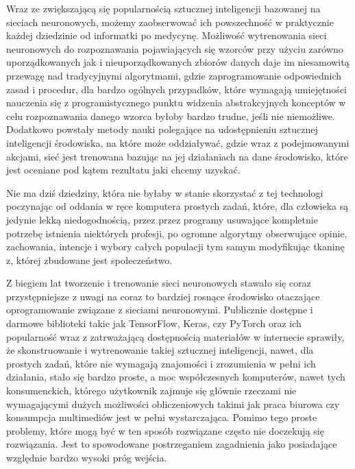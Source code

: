 Wraz ze zwiększającą się popularnością sztucznej inteligencji bazowanej na sieciach neuronowych, możemy zaobserwować ich powszechność w praktycznie każdej dziedzinie od informatki po medycynę. Możliwość wytrenowania sieci neuronowych do rozpoznawania pojawiających się wzorców przy użyciu zarówno uporządkowanych jak i nieuporządkowanych zbiorów danych daje im niesamowitą przewagę nad tradycyjnymi algorytmami, gdzie zaprogramowanie odpowiednich zasad i procedur, dla bardzo ogólnych przypadków, które wymagają umiejętności nauczenia się z programistycznego punktu widzenia abstrakcyjnych konceptów w celu rozpoznawania danego wzorca byłoby bardzo trudne, jeśli nie niemożliwe. Dodatkowo powstały metody nauki polegające na udostępnieniu  sztucznej inteligencji środowiska, na które może oddziaływać, gdzie wraz z podejmowanymi akcjami, sieć jest trenowana bazując na jej działaniach na dane środowisko, które jest oceniane pod kątem rezultatu jaki chcemy uzyskać.

Nie ma dziś dziedziny, która nie byłaby w stanie skorzystać z tej technologi poczynając od oddania w ręce komputera prostych zadań, które, dla człowieka są jedynie lekką niedogodnością, przez przez programy usuwające kompletnie potrzebę istnienia niektórych profesji, po ogromne algorytmy obserwujące opinie, zachowania, intencje i wybory całych populacji tym samym modyfikując tkaninę z, której zbudowane jest społeczeństwo.


Z biegiem lat tworzenie i trenowanie sieci neuronowych stawało się coraz przystępniejsze z uwagi na coraz to bardziej rosnące środowisko otaczające oprogramowanie związane z sieciami neuronowymi. Publicznie dostępne i darmowe biblioteki takie jak TensorFlow, Keras, czy PyTorch oraz ich popularność wraz z zatrważającą dostępnością materiałów w internecie sprawiły, że skonstruowanie i wytrenowanie takiej sztucznej inteligencji, nawet, dla prostych zadań, które nie wymagają znajomości i zrozumienia w pełni ich działania, stało się bardzo proste, a moc współczesnych komputerów, nawet tych konsumenckich, którego użytkownik zajmuje się głównie rzeczami nie wymagającymi dużych możliwości obliczeniowych takimi jak praca biurowa czy konsumpcja multimediów jest w pełni wystarczająca. Pomimo tego proste problemy, które mogą być w ten sposób rozwiązane często nie doczekują się rozwiązania. Jest to spowodowane postrzeganiem zagadnienia jako posiadające względnie bardzo wysoki próg wejścia.

